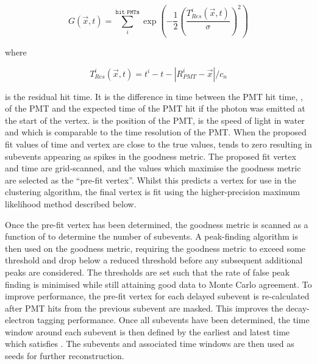 
\begin{equation}
  G(\vec{x},t) = \sum^{\texttt{hit PMTs}}_{i} \exp \left( - \frac{1}{2} \left( \frac{T_{Res}^{i}(\vec{x},t)}{\sigma} \right)^{2} \right)
\end{equation}

where

\begin{equation}
  T_{Res}^{i}(\vec{x},t) = t^{i} - t - \left| R^{i}_{PMT} - \vec{x} \right|/c_{n}
\end{equation}

is the residual hit time. It is the difference in time between the PMT hit time, , of the  PMT and the expected time of the PMT hit if the photon was emitted at the start of the vertex.  is the position of the  PMT,  is the speed of light in water and  which is comparable to the time resolution of the PMT. When the proposed fit values of time and vertex are close to the true values,  tends to zero resulting in subevents appearing as spikes in the goodness metric. The proposed fit vertex and time are grid-scanned, and the values which maximise the goodness metric are selected as the ``pre-fit vertex''. Whilst this predicts a vertex for use in the clustering algorithm, the final vertex is fit using the higher-precision maximum likelihood method described below.

Once the pre-fit vertex has been determined, the goodness metric is scanned as a function of  to determine the number of subevents. A peak-finding algorithm is then used on the goodness metric, requiring the goodness metric to exceed some threshold and drop below a reduced threshold before any subsequent additional peaks are considered. The thresholds are set such that the rate of false peak finding is minimised while still attaining good data to Monte Carlo agreement. To improve performance, the pre-fit vertex for each delayed subevent is re-calculated after PMT hits from the previous subevent are masked. This improves the decay-electron tagging performance. Once all subevents have been determined, the time window around each subevent is then defined by the earliest and latest time which satisfies . The subevents and associated time windows are then used as seeds for further reconstruction.

